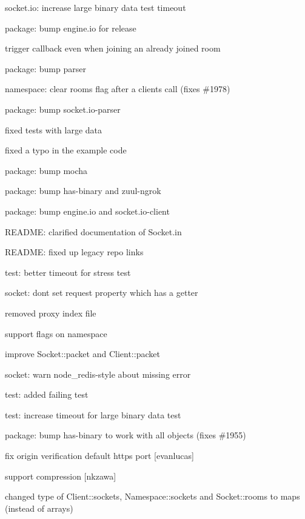 \begin{DoxyItemize}
\item socket.\+io\+: increase large binary data test timeout
\item package\+: bump {\ttfamily engine.\+io} for release
\item trigger callback even when joining an already joined room
\item package\+: bump parser
\item namespace\+: clear rooms flag after a clients call (fixes \#1978)
\item package\+: bump {\ttfamily socket.\+io-\/parser}
\item fixed tests with large data
\item fixed a typo in the example code
\item package\+: bump mocha
\item package\+: bump {\ttfamily has-\/binary} and {\ttfamily zuul-\/ngrok}
\item package\+: bump {\ttfamily engine.\+io} and {\ttfamily socket.\+io-\/client}
\item R\+E\+A\+D\+ME\+: clarified documentation of Socket.\+in
\item R\+E\+A\+D\+ME\+: fixed up legacy repo links
\item test\+: better timeout for stress test
\item socket\+: don\textquotesingle{}t set request property which has a getter
\item removed proxy index file
\item support flags on namespace
\item improve Socket\+::packet and Client\+::packet
\item socket\+: warn node\+\_\+redis-\/style about missing {\ttfamily error}
\item test\+: added failing test
\item test\+: increase timeout for large binary data test
\item package\+: bump {\ttfamily has-\/binary} to work with all objects (fixes \#1955)
\item fix origin verification default https port \mbox{[}evanlucas\mbox{]}
\item support compression \mbox{[}nkzawa\mbox{]}
\item changed type of {\ttfamily Client\+::sockets}, {\ttfamily Namespace\+::sockets} and {\ttfamily Socket\+::rooms} to maps (instead of arrays)
\end{DoxyItemize}

